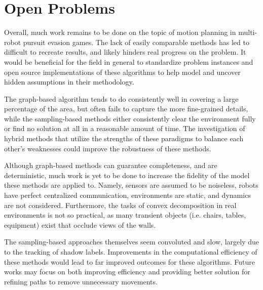 \documentclass[conference]{IEEEtran}
\begin{document}
\section{Open Problems}\label{sec:open_prob}
Overall, much work remains to be done on the topic of motion planning in multi-robot pursuit evasion games.
The lack of easily comparable methods has led to difficult to recreate results, and likely hinders real progress on the problem.
It would be beneficial for the field in general to standardize problem instances and open source implementations of these algorithms to help model and uncover hidden assumptions in their methodology.

The graph-based algorithm tends to do consistently well in covering a large percentage of the area, but often fails to capture the more fine-grained details, while the sampling-based methods either consistently clear the environment fully or find no solution at all in a reasonable amount of time.
The investigation of hybrid methods that utilize the strengths of these paradigms to balance each other's weaknesses could improve the robustness of these methods.

Although graph-based methods can guarantee completeness, and are deterministic, much work is yet to be done to increase the fidelity of the model these methods are applied to. Namely, sensors are assumed to be noiseless, robots have perfect centralized communication, environments are static, and dynamics are not considered. Furthermore, the tasks of convex decomposition in real environments is not so practical, as many transient objects (i.e. chairs, tables, equipment) exist that occlude views of the walls.

The sampling-based approaches themselves seem convoluted and slow, largely due to the tracking of shadow labels.
Improvements in the computational efficiency of these methods would lead to far improved outcomes for these algorithms.
Future works may focus on both improving efficiency and providing better solution for refining paths to remove unnecessary movements.
\end{document}
